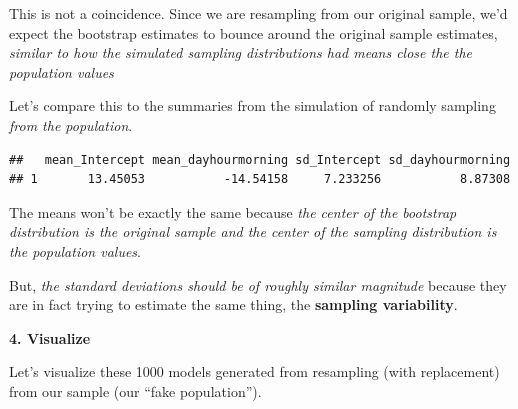 \documentclass[
]{book}
\newenvironment{Shaded}{\begin{snugshade}}{\end{snugshade}}
\newcommand{\CharTok}[1]{\textcolor[rgb]{0.31,0.60,0.02}{#1}}
\newcommand{\CommentTok}[1]{\textcolor[rgb]{0.56,0.35,0.01}{\textit{#1}}}
\newcommand{\DataTypeTok}[1]{\textcolor[rgb]{0.13,0.29,0.53}{#1}}
\newcommand{\DecValTok}[1]{\textcolor[rgb]{0.00,0.00,0.81}{#1}}
\newcommand{\KeywordTok}[1]{\textcolor[rgb]{0.13,0.29,0.53}{\textbf{#1}}}
\newcommand{\NormalTok}[1]{#1}
\newcommand{\OperatorTok}[1]{\textcolor[rgb]{0.81,0.36,0.00}{\textbf{#1}}}
\newcommand{\StringTok}[1]{\textcolor[rgb]{0.31,0.60,0.02}{#1}}
\begin{document}
This is not a coincidence. Since we are resampling from our original sample, we'd expect the bootstrap estimates to bounce around the original sample estimates, \emph{similar to how the simulated sampling distributions had means close the the population values}

Let's compare this to the summaries from the simulation of randomly sampling \emph{from the population}.

\begin{Shaded}
\end{Shaded}

\begin{verbatim}
##   mean_Intercept mean_dayhourmorning sd_Intercept sd_dayhourmorning
## 1       13.45053           -14.54158     7.233256           8.87308
\end{verbatim}

The means won't be exactly the same because \emph{the center of the bootstrap distribution is the original sample and the center of the sampling distribution is the population values}.

But, \emph{the standard deviations should be of roughly similar magnitude} because they are in fact trying to estimate the same thing, the \textbf{sampling variability}.

\textbf{4. Visualize}

Let's visualize these 1000 models generated from resampling (with replacement) from our sample (our ``fake population'').

\begin{Shaded}
\end{Shaded}
\end{document}
